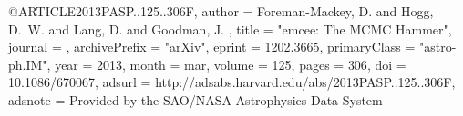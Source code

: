 @ARTICLE{2013PASP..125..306F, 
  author = {{Foreman-Mackey}, D. and {Hogg}, D.~W. and {Lang}, D. and {Goodman}, J. }, 
  title = "{emcee: The MCMC Hammer}", 
  journal = {\pasp}, 
  archivePrefix = "arXiv", 
  eprint = {1202.3665}, 
  primaryClass = "astro-ph.IM", 
  year = 2013, 
  month = mar, 
  volume = 125, 
  pages = {306}, 
  doi = {10.1086/670067}, 
  adsurl = {http://adsabs.harvard.edu/abs/2013PASP..125..306F}, 
  adsnote = {Provided by the SAO/NASA Astrophysics Data System}}


